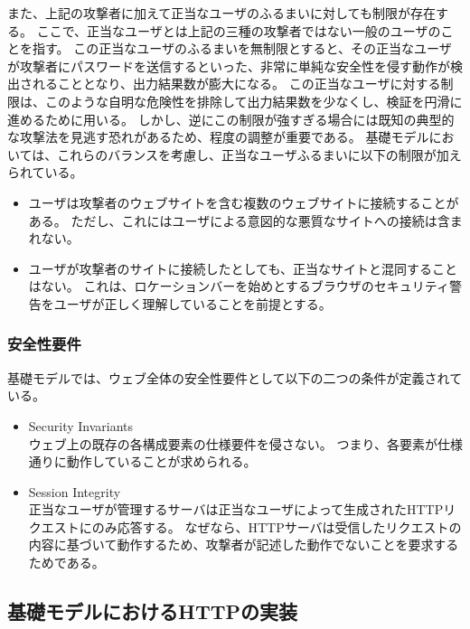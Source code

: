 \documentclass[12pt,a4paper]{jbook}
\begin{document}
また、上記の攻撃者に加えて正当なユーザのふるまいに対しても制限が存在する。
ここで、正当なユーザとは上記の三種の攻撃者ではない一般のユーザのことを指す。
この正当なユーザのふるまいを無制限とすると、その正当なユーザが攻撃者にパスワードを送信するといった、非常に単純な安全性を侵す動作が検出されることとなり、出力結果数が膨大になる。
この正当なユーザに対する制限は、このような自明な危険性を排除して出力結果数を少なくし、検証を円滑に進めるために用いる。
しかし、逆にこの制限が強すぎる場合には既知の典型的な攻撃法を見逃す恐れがあるため、程度の調整が重要である。
基礎モデルにおいては、これらのバランスを考慮し、正当なユーザふるまいに以下の制限が加えられている。
\begin{itemize}
\item ユーザは攻撃者のウェブサイトを含む複数のウェブサイトに接続することがある。
ただし、これにはユーザによる意図的な悪質なサイトへの接続は含まれない。
\item ユーザが攻撃者のサイトに接続したとしても、正当なサイトと混同することはない。
これは、ロケーションバーを始めとするブラウザのセキュリティ警告をユーザが正しく理解していることを前提とする。
\end{itemize}

\subsubsection{安全性要件}
基礎モデルでは、ウェブ全体の安全性要件として以下の二つの条件が定義されている。
\begin{itemize}
\item Security Invariants\\
ウェブ上の既存の各構成要素の仕様要件を侵さない。
つまり、各要素が仕様通りに動作していることが求められる。
\item Session Integrity\\
正当なユーザが管理するサーバは正当なユーザによって生成されたHTTPリクエストにのみ応答する。
なぜなら、HTTPサーバは受信したリクエストの内容に基づいて動作するため、攻撃者が記述した動作でないことを要求するためである。
\end{itemize}

\subsection{基礎モデルにおけるHTTPの実装}
\label{sec:based-model-http}
\end{document}
